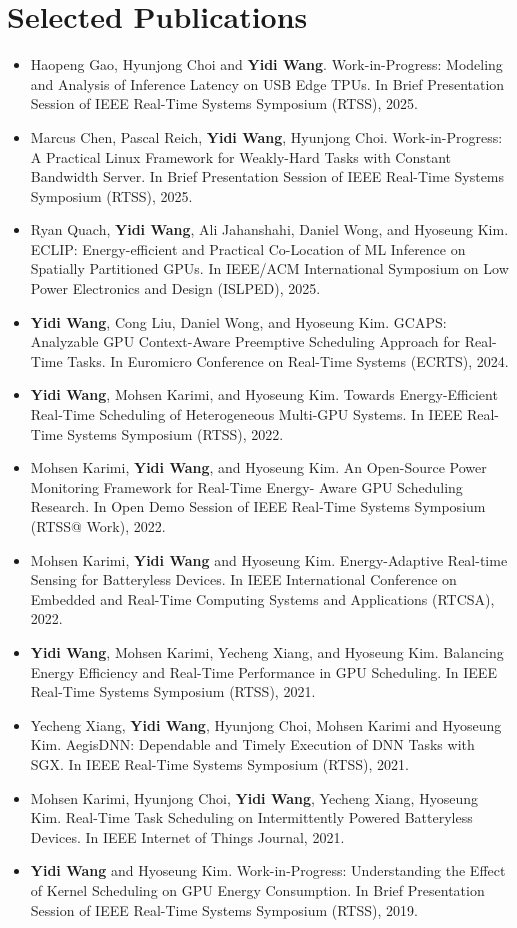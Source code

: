 \documentclass[letterpaper,10pt]{article}
\begin{document}
  \section{Selected Publications}
  \begin{justify}
  \begin{itemize}
    \item Haopeng Gao, Hyunjong Choi and \textbf{Yidi Wang}. Work-in-Progress: Modeling and Analysis of Inference Latency on USB Edge TPUs. In Brief Presentation Session of IEEE Real-Time Systems Symposium (RTSS), 2025.
    \item Marcus Chen, Pascal Reich, \textbf{Yidi Wang},  Hyunjong Choi. Work-in-Progress: A Practical Linux Framework for Weakly-Hard Tasks with Constant Bandwidth Server. In Brief Presentation Session of IEEE Real-Time Systems Symposium (RTSS), 2025.
   \item Ryan Quach, \textbf{Yidi Wang}, Ali Jahanshahi, Daniel Wong, and Hyoseung Kim. ECLIP: Energy-efficient and Practical Co-Location of ML Inference on Spatially Partitioned GPUs. In IEEE/ACM International Symposium on Low Power Electronics and Design (ISLPED), 2025.
    \item \textbf{Yidi Wang}, Cong Liu, Daniel Wong, and Hyoseung Kim. GCAPS: Analyzable GPU Context-Aware Preemptive Scheduling Approach for Real-Time Tasks. In Euromicro Conference on Real-Time Systems (ECRTS), 2024.
    \item \textbf{Yidi Wang}, Mohsen Karimi, and Hyoseung Kim. Towards Energy-Efficient Real-Time Scheduling of Heterogeneous Multi-GPU Systems. In IEEE Real-Time Systems Symposium (RTSS), 2022.
    \item Mohsen Karimi, \textbf{Yidi Wang}, and Hyoseung Kim. An Open-Source Power Monitoring Framework for Real-Time Energy- Aware GPU Scheduling Research. In Open Demo Session of IEEE Real-Time Systems Symposium (RTSS@ Work), 2022.
    \item Mohsen Karimi, \textbf{Yidi Wang} and Hyoseung Kim. Energy-Adaptive Real-time Sensing for Batteryless Devices. In IEEE International Conference on Embedded and Real-Time Computing Systems and Applications (RTCSA), 2022.
    \item \textbf{Yidi Wang}, Mohsen Karimi, Yecheng Xiang, and Hyoseung Kim. Balancing Energy Efficiency and Real-Time Performance in GPU Scheduling. In IEEE Real-Time Systems Symposium (RTSS), 2021.
    \item Yecheng Xiang, \textbf{Yidi Wang}, Hyunjong Choi, Mohsen Karimi and Hyoseung Kim. AegisDNN: Dependable and Timely Execution of DNN Tasks with SGX. In IEEE Real-Time Systems Symposium (RTSS), 2021.
    \item Mohsen Karimi, Hyunjong Choi, \textbf{Yidi Wang}, Yecheng Xiang, Hyoseung Kim. Real-Time Task Scheduling on Intermittently Powered Batteryless Devices. In IEEE Internet of Things Journal, 2021.
    \item \textbf{Yidi Wang} and Hyoseung Kim. Work-in-Progress: Understanding the Effect of Kernel Scheduling on GPU Energy Consumption. In Brief Presentation Session of IEEE Real-Time Systems Symposium (RTSS), 2019.
  \end{itemize}
  \end{justify}
\end{document}
